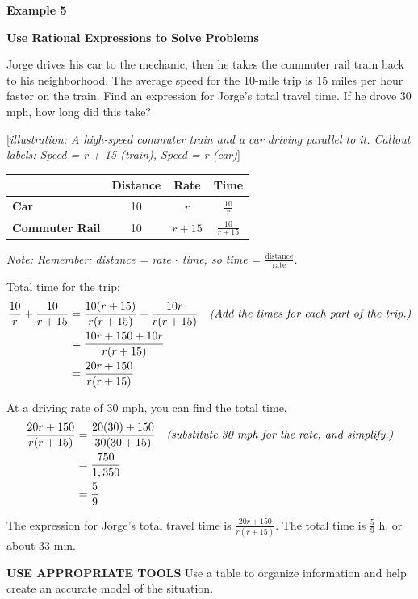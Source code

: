 \documentclass{article}
\newenvironment{concept-box}{}{}
\newenvironment{example}[1]{\textbf{Example #1}\par}{\par}
\newcommand{\placeholder}[2]{[\textit{#1: #2}]}
\begin{document}
\begin{example}{5}
\textbf{Use Rational Expressions to Solve Problems}

Jorge drives his car to the mechanic, then he takes the commuter rail train back to his neighborhood. The average speed for the 10-mile trip is 15 miles per hour faster on the train. Find an expression for Jorge's total travel time. If he drove 30 mph, how long did this take?

\placeholder{illustration}{A high-speed commuter train and a car driving parallel to it. Callout labels: Speed = r + 15 (train), Speed = r (car)}

\begin{tabular}{lccc}
\toprule
& \textbf{Distance} & \textbf{Rate} & \textbf{Time} \\
\midrule
\textbf{Car} & 10 & $r$ & $\frac{10}{r}$ \\
\textbf{Commuter Rail} & 10 & $r + 15$ & $\frac{10}{r + 15}$ \\
\bottomrule
\end{tabular}
\textit{Note: Remember: distance = rate $\cdot$ time, so time = $\frac{\text{distance}}{\text{rate}}$.}

Total time for the trip:
\begin{align*}
\frac{10}{r} + \frac{10}{r + 15} &= \frac{10(r + 15)}{r(r + 15)} + \frac{10r}{r(r + 15)} \quad \text{\textit{(Add the times for each part of the trip.)}} \\
&= \frac{10r + 150 + 10r}{r(r + 15)} \\
&= \frac{20r + 150}{r(r + 15)}
\end{align*}

At a driving rate of 30 mph, you can find the total time.
\begin{align*}
\frac{20r + 150}{r(r + 15)} &= \frac{20(30) + 150}{30(30 + 15)} \quad \text{\textit{(substitute 30 mph for the rate, and simplify.)}} \\
&= \frac{750}{1,350} \\
&= \frac{5}{9}
\end{align*}

The expression for Jorge's total travel time is $\frac{20r + 150}{r(r + 15)}$. The total time is $\frac{5}{9}$ h, or about 33 min.
\end{example}

\begin{concept-box}
\textbf{USE APPROPRIATE TOOLS}
Use a table to organize information and help create an accurate model of the situation.
\end{concept-box}
\end{document}
